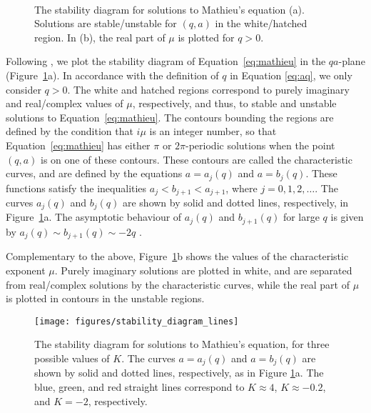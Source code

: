 \documentclass[12pt]{ociamthesis}
\begin{document}
\begin{figure}[!ht]
\centering
{}
\\
\caption{The stability diagram for solutions to Mathieu's equation (a).
Solutions are stable/unstable for $(q, a)$ in the white/hatched region.
In (b), the real part of $\mu$ is plotted for $q > 0$.}
\label{fig:stability_diagram}
\end{figure}

Following \cite{McLachlan1946}, we plot the stability diagram of Equation~\eqref{eq:mathieu} in the $qa$\/-plane (Figure~\ref{fig:stability_diagram}a).
In accordance with the definition of $q$ in Equation \eqref{eq:aq}, we only consider $q > 0$.
The white and hatched regions correspond to purely imaginary and real/complex values of $\mu$, respectively, and thus, to stable and unstable solutions to Equation~\eqref{eq:mathieu}.
The contours bounding the regions are defined by the condition that $i\mu$ is an integer number, so that Equation~\eqref{eq:mathieu} has either $\pi$ or $2\pi$\/-periodic solutions when the point $(q,a)$ is on one of these contours.
These contours are called the characteristic curves, and are defined by the equations $a = a_j(q)$ and $a = b_j(q)$.
These functions satisfy the inequalities $a_j < b_{j+1} < a_{j+1}$\/, where $j = 0,1,2,\dots$.
The curves $a_j(q)$ and $b_j(q)$ are shown by solid and dotted lines, respectively, in Figure~\ref{fig:stability_diagram}a. The asymptotic behaviour of $a_j(q)$ and $b_{j+1}(q)$ for large $q$ is given by $a_j(q) \sim b_{j+1}(q) \sim -2q$ \citep{Abramowitz1965}.

Complementary to the above, Figure~\ref{fig:stability_diagram}b shows the values of the characteristic exponent $\mu$. Purely imaginary solutions are plotted in white, and are separated from real/complex solutions by the characteristic curves, while the real part of $\mu$ is plotted in contours in the unstable regions.

\begin{figure}[t]
\centering
\texttt{[image: figures/stability\_diagram\_lines]}
\caption{The stability diagram for solutions to Mathieu's equation, for three possible values of $K$.
The curves $a = a_j(q)$ and $a = b_j(q)$ are shown by solid and dotted lines, respectively, as in Figure \ref{fig:stability_diagram}a.
The blue, green, and red straight lines correspond to $K \approx 4$, $K \approx - 0.2$, and $K = -2$, respectively.}
\label{fig:stability_diagram_lines}
\end{figure}
\end{document}
